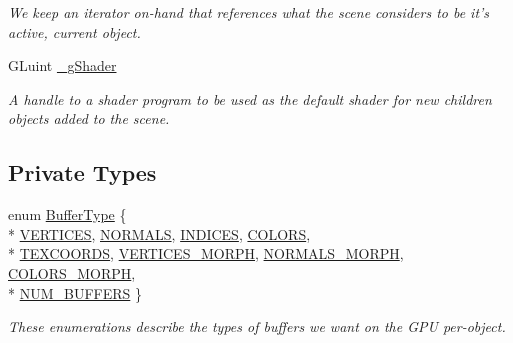 \begin{DoxyCompactItemize}
\begin{DoxyCompactList}\small\item\em We keep an iterator on-\/hand that references what the scene considers to be it's active, current object. \end{DoxyCompactList}\item 
\hypertarget{class_scene_a8f9bdd8ec5edb1f414fbd314a36e2724}{G\-Luint \hyperlink{class_scene_a8f9bdd8ec5edb1f414fbd314a36e2724}{\-\_\-g\-Shader}}\label{class_scene_a8f9bdd8ec5edb1f414fbd314a36e2724}

\begin{DoxyCompactList}\small\item\em A handle to a shader program to be used as the default shader for new children objects added to the scene. \end{DoxyCompactList}\end{DoxyCompactItemize}
\subsection*{Private Types}
\begin{DoxyCompactItemize}
\item 
enum \hyperlink{class_object_a51d08da3bd559d08734197006bc29a79}{Buffer\-Type} \{ \\*
\hyperlink{class_object_a51d08da3bd559d08734197006bc29a79a23be05de1d4a9e5738eff4c1860f8bfd}{V\-E\-R\-T\-I\-C\-E\-S}, 
\hyperlink{class_object_a51d08da3bd559d08734197006bc29a79ac91e7a2ef76150b999a9af53d229a8e0}{N\-O\-R\-M\-A\-L\-S}, 
\hyperlink{class_object_a51d08da3bd559d08734197006bc29a79abe6f0cf968db450f99d8e176c4d23091}{I\-N\-D\-I\-C\-E\-S}, 
\hyperlink{class_object_a51d08da3bd559d08734197006bc29a79a69fb14c98b43d636b30ef5e77b492968}{C\-O\-L\-O\-R\-S}, 
\\*
\hyperlink{class_object_a51d08da3bd559d08734197006bc29a79adc601b2ac4ff7f3e455faa35208e431f}{T\-E\-X\-C\-O\-O\-R\-D\-S}, 
\hyperlink{class_object_a51d08da3bd559d08734197006bc29a79a0e9e165431001465775bc5ba2b8d1bd8}{V\-E\-R\-T\-I\-C\-E\-S\-\_\-\-M\-O\-R\-P\-H}, 
\hyperlink{class_object_a51d08da3bd559d08734197006bc29a79aa2afe042e85c0772ba75ba0ee6223a57}{N\-O\-R\-M\-A\-L\-S\-\_\-\-M\-O\-R\-P\-H}, 
\hyperlink{class_object_a51d08da3bd559d08734197006bc29a79a814c8171ad45f6e954ffb474a5dfacb1}{C\-O\-L\-O\-R\-S\-\_\-\-M\-O\-R\-P\-H}, 
\\*
\hyperlink{class_object_a51d08da3bd559d08734197006bc29a79a1999a38dc687c7ae05c884078de39b51}{N\-U\-M\-\_\-\-B\-U\-F\-F\-E\-R\-S}
 \}
\begin{DoxyCompactList}\small\item\em These enumerations describe the types of buffers we want on the G\-P\-U per-\/object. \end{DoxyCompactList}\end{DoxyCompactItemize}


